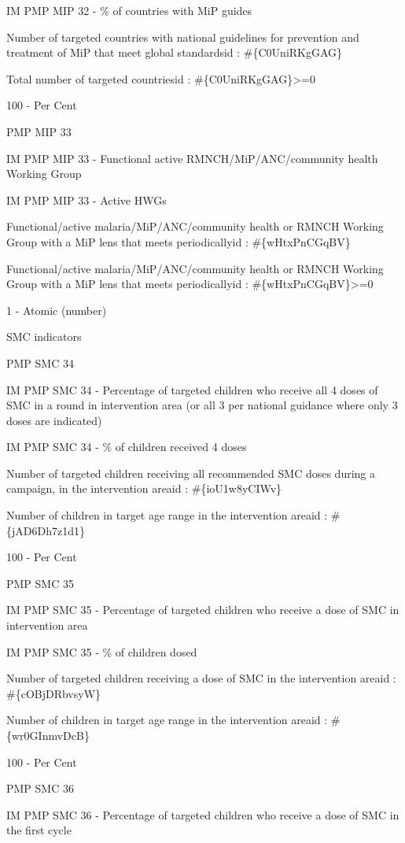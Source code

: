 \documentclass[]{book}
\begin{document}
IM PMP MIP 32 - \% of countries with MiP guides

Number of targeted countries with national guidelines for prevention and treatment of MiP that meet global standardsid : \#\{C0UniRKgGAG\}

Total number of targeted countriesid : \#\{C0UniRKgGAG\}\textgreater{}=0

100 - Per Cent

PMP MIP 33

IM PMP MIP 33 - Functional active RMNCH/MiP/ANC/community health Working Group

IM PMP MIP 33 - Active HWGs

Functional/active malaria/MiP/ANC/community health or RMNCH Working Group with a MiP lens that meets periodicallyid : \#\{wHtxPnCGqBV\}

Functional/active malaria/MiP/ANC/community health or RMNCH Working Group with a MiP lens that meets periodicallyid : \#\{wHtxPnCGqBV\}\textgreater{}=0

1 - Atomic (number)

SMC indicators

PMP SMC 34

IM PMP SMC 34 - Percentage of targeted children who receive all 4 doses of SMC in a round in intervention area (or all 3 per national guidance where only 3 doses are indicated)

IM PMP SMC 34 - \% of children received 4 doses

Number of targeted children receiving all recommended SMC doses during a campaign, in the intervention areaid : \#\{ioU1w8yCIWv\}

Number of children in target age range in the intervention areaid : \#\{jAD6Dh7z1d1\}

100 - Per Cent

PMP SMC 35

IM PMP SMC 35 - Percentage of targeted children who receive a dose of SMC in intervention area

IM PMP SMC 35 - \% of children dosed

Number of targeted children receiving a dose of SMC in the intervention areaid : \#\{cOBjDRbvsyW\}

Number of children in target age range in the intervention areaid : \#\{wr0GInmvDcB\}

100 - Per Cent

PMP SMC 36

IM PMP SMC 36 - Percentage of targeted children who receive a dose of SMC in the first cycle
\end{document}
